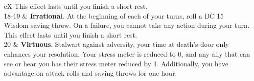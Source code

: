\begin{table}[t]
\begin{DndTable}[width=\linewidth, header=Affliction]{cX}
        This effect lasts until you finish a short rest. \\
        18-19 & \textbf{Irrational}.
        At the beginning of each of your turns, roll a DC 15 Wisdom saving throw.
        On a failure, you cannot take any action during your turn.
        This effect lasts until you finish a short rest. \\
        20    & \textbf{Virtuous}.
        Stalwart against adversity, your time at death's door only enhances your resolution.
        Your stress meter is reduced to 0, and any ally that can see or hear you has their stress meter reduced by 1.
        Additionally, you have advantage on attack rolls and saving throws for one hour.
    \end{DndTable}
    \end{table}

    \thispagestyle{empty}
